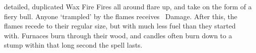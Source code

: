   {detailed, duplicated}%
  {Wax}%
  {Fire}%
  {}%
  {Fires all around flare up, and take on the form of a fiery bull.
  Anyone `trampled' by the flames receives \showDam\ Damage.
}%
  {After this, the flames recede to their regular size, but with much less fuel than they started with.
  Furnaces burn through their wood, and candles often burn down to a stump within that long second the spell lasts.}

